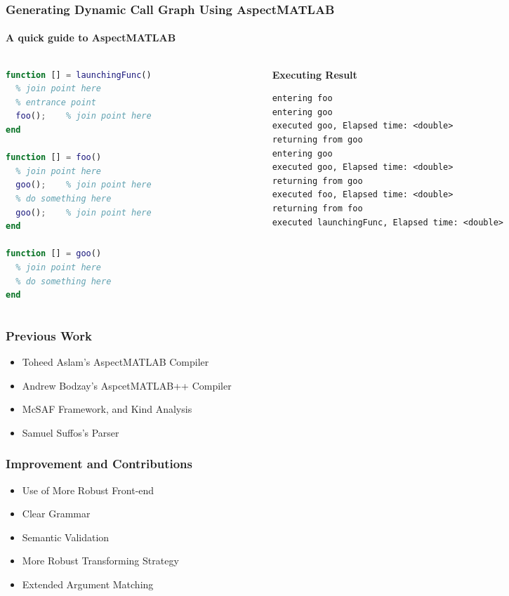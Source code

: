 \documentclass[10pt]{beamer}
\begin{document}
\begin{frame}[fragile]
\frametitle{Generating Dynamic Call Graph Using AspectMATLAB}
\framesubtitle{A quick guide to AspectMATLAB}
\begin{columns}
\begin{column}[T]{0.5\textwidth}
\begin{lstlisting}[basicstyle=\small, language=MATLAB]
function [] = launchingFunc()
  % join point here 
  % entrance point
  foo();    % join point here
end

function [] = foo()
  % join point here
  goo();    % join point here
  % do something here
  goo();    % join point here
end

function [] = goo()
  % join point here
  % do something here
end
\end{lstlisting}    
\end{column}

\pause

\begin{column}[T]{0.5\textwidth}
\textbf{Executing Result}
\begin{lstlisting}[basicstyle=\small]
entering foo
entering goo
executed goo, Elapsed time: <double>
returning from goo
entering goo
executed goo, Elapsed time: <double>
returning from goo
executed foo, Elapsed time: <double>
returning from foo
executed launchingFunc, Elapsed time: <double>
\end{lstlisting}
\end{column}
\end{columns}
\end{frame}

\begin{frame}
\frametitle{Previous Work}
\begin{itemize}
    \item Toheed Aslam's AspectMATLAB Compiler
    \item Andrew Bodzay's AspcetMATLAB++ Compiler
    \item McSAF Framework, and Kind Analysis
    \item Samuel Suffos's Parser
\end{itemize}
\end{frame}

\begin{frame}
\frametitle{Improvement and Contributions}
\begin{itemize}
    \item Use of More Robust Front-end
    \item Clear Grammar
    \item Semantic Validation
    \item More Robust Transforming Strategy
    \item Extended Argument Matching
\end{itemize}
\end{frame}
\end{document}
